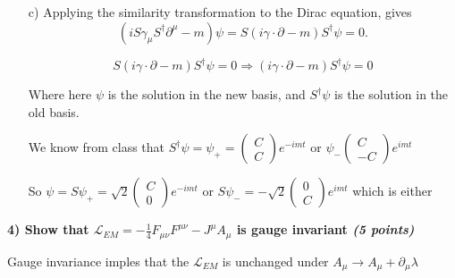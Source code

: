 {{\begin{itemize}
So both A and C are $\pm I$ and above implies that $a = -c$

So $S = \frac{1}{\sqrt{2}}\begin{pmatrix} I & I \\ -I & I \end{pmatrix}$
and $S^\dagger = \frac{1}{\sqrt{2}}\begin{pmatrix} I & -I \\ I & I \end{pmatrix}$


\item[c)]
 Applying the similarity transformation to the Dirac equation, gives 
\begin{equation*}
(i S \gamma_\mu S^\dagger \partial^{\mu} - m)\psi = S(i\gamma \cdot \partial - m)S^\dagger\psi = 0.
\end{equation*}

\begin{equation*}
S(i\gamma \cdot \partial - m)S^\dagger\psi = 0 \Rightarrow (i\gamma \cdot \partial - m)S^\dagger\psi = 0
\end{equation*}

Where here $\psi$ is the solution in the new basis, and $S^\dagger \psi$ is the solution in the old basis.


We know from class that $S^\dagger \psi = \psi_+ = \begin{pmatrix} C \\ C \end{pmatrix} e ^{-imt}$ or $\psi_- \begin{pmatrix} C \\ -C \end{pmatrix} e^{imt}$

So $\psi = S\psi_+ = \sqrt{2} \begin{pmatrix}  C \\ 0 \end{pmatrix} e ^{-imt}$ or $S\psi_- = -\sqrt{2} \begin{pmatrix} 0 \\  C \end{pmatrix} e ^{imt}$ which is either 


\end{itemize}

\vspace*{0.25in}

\textbf{4) Show that  $\mathscr{L}_{EM} = -\frac{1}{4}F_{\mu\nu}F^{\mu\nu} - J^{\mu}A_{\mu}$ is gauge invariant \hfill \textit{(5 points)}}

Gauge invariance imples that the $\mathscr{L}_{EM}$ is unchanged under $A_\mu \rightarrow A_\mu + \partial_\mu \lambda$


}}
